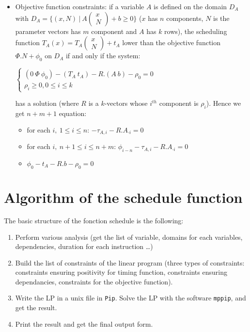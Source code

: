 \begin{itemize}
\item  Objective function constraints: 
if a variable $A$ is defined on the domain
$D_A$ with $D_A=\{(x,N) ~|~ A\left(\begin{array}{c} x\\ N \end{array}\right) + b \geq 0 \}$ ($x$ has $n$ components, $N$ is the parameter vectors has $m$ component and $A$ has 
$k$ rows), the scheduling function 
$T_A(x) = T_A\left(\begin{array}{c} x\\ N \end{array}\right) + t_A$ 
lower than the objective function $\Phi.N + \phi_0$ on  $D_A$ 
if and only if the system: \\
\centerline{$\left\{\begin{array}{l} (0 \ \Phi \ \phi_0) - (T_A\ t_A) - R.(A\ b) - \rho_0 = 0   \\
\rho_i \geq 0, 0 \leq i \leq k\end{array}\right.$
}
has a solution (where $R$ is a $k$-vectors whose $i^{th}$ component 
is $\rho_i$).  Hence we get $n+m+1$ equation: 
\begin{itemize}
\item for each $i, \ 1 \leq i \leq n$:  $-\tau_{A,i}   - R.A_{\cdot i} = 0$
\item for each $i, \  n+1 \leq i \leq n+m$: $\phi_{i-n} -  \tau_{A,i}   - R.A_{\cdot i} = 0$
\item $\phi_0 - t_A - R.b - \rho_0 = 0$
\end{itemize}
\end{itemize}

\section{Algorithm of the schedule function}

The basic structure of the fonction schedule is the following:
\begin{enumerate}
\item Perform various analysis (get the list of variable, domains for each 
 variables,  dependencies, duration for each instruction \ldots)
\item Build the list of constraints of the linear program (three types 
of constraints: constraints ensuring positivity for timing function,
constraints  ensuring dependancies, constraints for the objective function).
\item Write the LP in a unix file in {\tt Pip}. Solve the LP with 
the software  {\tt mppip}, and get the result.
\item Print the result and get the final output form.
\end{enumerate}

